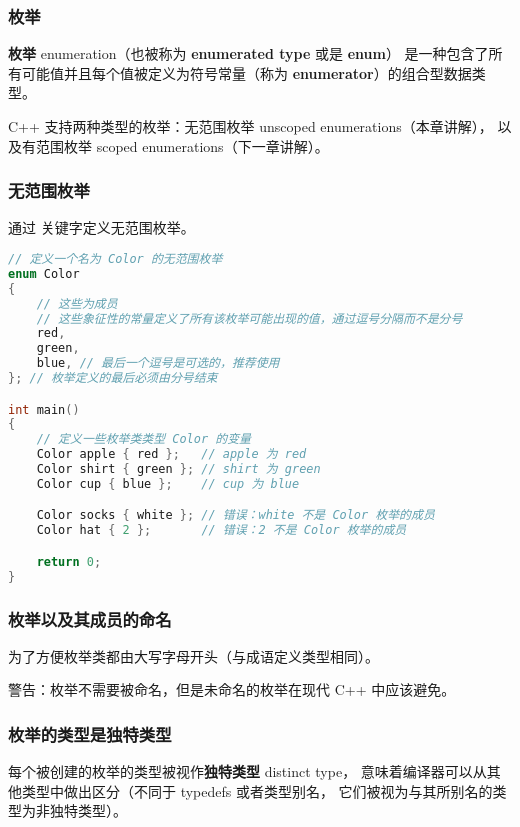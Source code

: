 \documentclass[../../LearnCpp.tex]{subfiles}
\begin{document}

\subsubsection*{枚举}

\textbf{枚举} enumeration（也被称为 \textbf{enumerated type} 或是 \textbf{enum}）
是一种包含了所有可能值并且每个值被定义为符号常量（称为 \textbf{enumerator}）的组合型数据类型。

C++ 支持两种类型的枚举：无范围枚举 unscoped enumerations（本章讲解），
以及有范围枚举 scoped enumerations（下一章讲解）。

\subsubsection*{无范围枚举}

通过  关键字定义无范围枚举。

\begin{lstlisting}[language=C++]
// 定义一个名为 Color 的无范围枚举
enum Color
{
    // 这些为成员
    // 这些象征性的常量定义了所有该枚举可能出现的值，通过逗号分隔而不是分号
    red,
    green,
    blue, // 最后一个逗号是可选的，推荐使用
}; // 枚举定义的最后必须由分号结束

int main()
{
    // 定义一些枚举类类型 Color 的变量
    Color apple { red };   // apple 为 red
    Color shirt { green }; // shirt 为 green
    Color cup { blue };    // cup 为 blue

    Color socks { white }; // 错误：white 不是 Color 枚举的成员
    Color hat { 2 };       // 错误：2 不是 Color 枚举的成员

    return 0;
}
\end{lstlisting}

\subsubsection*{枚举以及其成员的命名}

为了方便枚举类都由大写字母开头（与成语定义类型相同）。

警告：枚举不需要被命名，但是未命名的枚举在现代 C++ 中应该避免。

\subsubsection*{枚举的类型是独特类型}

每个被创建的枚举的类型被视作\textbf{独特类型} distinct type，
意味着编译器可以从其他类型中做出区分（不同于 typedefs 或者类型别名，
它们被视为与其所别名的类型为非独特类型）。
\end{document}
